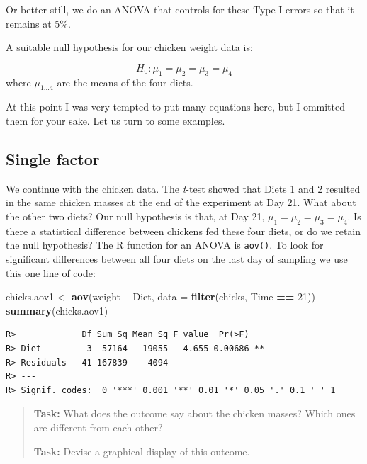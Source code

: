 \documentclass[english,10pt,a4paper,oneside]{book}
\newenvironment{Shaded}{\begin{snugshade}}{\end{snugshade}}
\newcommand{\DataTypeTok}[1]{\textcolor[rgb]{0.13,0.29,0.53}{#1}}
\newcommand{\DecValTok}[1]{\textcolor[rgb]{0.00,0.00,0.81}{#1}}
\newcommand{\KeywordTok}[1]{\textcolor[rgb]{0.13,0.29,0.53}{\textbf{#1}}}
\newcommand{\NormalTok}[1]{#1}
\newcommand{\OperatorTok}[1]{\textcolor[rgb]{0.81,0.36,0.00}{\textbf{#1}}}
\newcommand{\StringTok}[1]{\textcolor[rgb]{0.31,0.60,0.02}{#1}}
\theoremstyle{definition}
\theoremstyle{definition}
\theoremstyle{definition}
\theoremstyle{remark}
\begin{document}
Or better still, we do an ANOVA that controls for these Type I errors so
that it remains at 5\%.

A suitable null hypothesis for our chicken weight data is:

\[H_{0}:\mu_{1}=\mu_{2}=\mu_{3}=\mu_{4}\] where \(\mu_{1...4}\) are the
means of the four diets.

At this point I was very tempted to put many equations here, but I
ommitted them for your sake. Let us turn to some examples.

\hypertarget{single-factor}{%
\subsection{Single factor}\label{single-factor}}

We continue with the chicken data. The \emph{t}-test showed that Diets 1
and 2 resulted in the same chicken masses at the end of the experiment
at Day 21. What about the other two diets? Our null hypothesis is that,
at Day 21, \(\mu_{1}=\mu_{2}=\mu_{3}=\mu_{4}\). Is there a statistical
difference between chickens fed these four diets, or do we retain the
null hypothesis? The R function for an ANOVA is \texttt{aov()}. To look
for significant differences between all four diets on the last day of
sampling we use this one line of code:

\begin{Shaded}
\begin{Highlighting}[]
\NormalTok{chicks.aov1 <-}\StringTok{ }\KeywordTok{aov}\NormalTok{(weight }\OperatorTok{~}\StringTok{ }\NormalTok{Diet, }\DataTypeTok{data =} \KeywordTok{filter}\NormalTok{(chicks, Time }\OperatorTok{==}\StringTok{ }\DecValTok{21}\NormalTok{))}
\KeywordTok{summary}\NormalTok{(chicks.aov1)}
\end{Highlighting}
\end{Shaded}

\begin{verbatim}
R>             Df Sum Sq Mean Sq F value  Pr(>F)   
R> Diet         3  57164   19055   4.655 0.00686 **
R> Residuals   41 167839    4094                   
R> ---
R> Signif. codes:  0 '***' 0.001 '**' 0.01 '*' 0.05 '.' 0.1 ' ' 1
\end{verbatim}

\begin{quote}
\textbf{Task:} What does the outcome say about the chicken masses? Which
ones are different from each other?

\textbf{Task:} Devise a graphical display of this outcome.
\end{quote}
\end{document}
